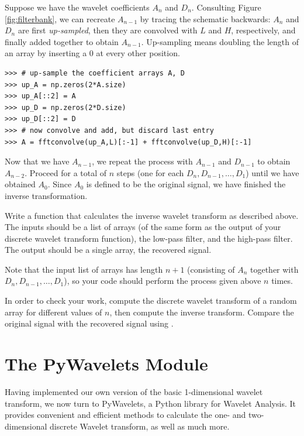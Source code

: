 Suppose we have the wavelet coefficients $A_n$ and $D_n$. Consulting Figure \ref{fig:filterbank},
we can recreate $A_{n-1}$ by tracing the schematic backwards: $A_n$ and $D_n$ are first
\emph{up-sampled}, then they are convolved with $L$ and $H$, respectively, and finally
added together to obtain $A_{n-1}$. Up-sampling means doubling the length of an array
by inserting a 0 at every other position.

\begin{lstlisting}
>>> # up-sample the coefficient arrays A, D
>>> up_A = np.zeros(2*A.size)
>>> up_A[::2] = A
>>> up_D = np.zeros(2*D.size)
>>> up_D[::2] = D
>>> # now convolve and add, but discard last entry
>>> A = fftconvolve(up_A,L)[:-1] + fftconvolve(up_D,H)[:-1]
\end{lstlisting}

Now that we have $A_{n-1}$, we repeat the process with $A_{n-1}$ and $D_{n-1}$ to obtain
$A_{n-2}$. Proceed for a total of $n$ steps (one for each $D_n, D_{n-1},\ldots ,D_1$) until we have obtained $A_0$.
Since $A_0$ is defined to be the original
signal, we have finished the inverse transformation.

\begin{problem} %
Write a function that calculates the inverse wavelet transform as described above.
The inputs should be a list of arrays (of the same form as the output of your discrete
wavelet transform function), the low-pass filter, and the high-pass filter.
The output should be a single array, the recovered signal.

Note that the input list of arrays has length $n+1$ (consisting of $A_n$ together with
$D_n, D_{n-1}, \ldots, D_1$), so your code should perform the process given above $n$ times.

In order to check your work, compute
the discrete wavelet transform of a random array for different values of $n$, then compute the inverse
transform.
Compare the original signal with the recovered signal using .
\end{problem}

\section*{The PyWavelets Module} %

Having implemented our own version of the basic 1-dimensional wavelet transform, we now turn to
PyWavelets, a Python library for Wavelet Analysis.
It provides convenient and efficient methods to calculate the one- and two-dimensional discrete Wavelet
transform, as well as much more.

